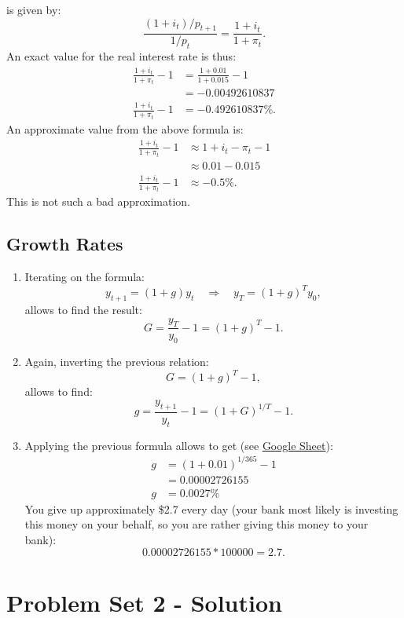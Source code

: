 \documentclass[]{book}
\theoremstyle{definition}
\theoremstyle{definition}
\theoremstyle{definition}
\theoremstyle{remark}
\begin{document}
\begin{enumerate}
  is given by: \[\frac{(1+i_t)/p_{t+1}}{1/p_t}=\frac{1+i_t}{1+\pi_t}.\]
  An exact value for the real interest rate is thus: \[\begin{aligned}
  \frac{1+i_t}{1+\pi_t}-1&=\frac{1+0.01}{1+0.015}-1\\
  &=-0.00492610837\\ 
  \frac{1+i_t}{1+\pi_t}-1&= -0.492610837\%.
  \end{aligned}\] An approximate value from the above formula is:
  \[\begin{aligned}
  \frac{1+i_t}{1+\pi_t}-1&\approx1+i_t-\pi_t-1\\
  &\approx0.01-0.015\\
  \frac{1+i_t}{1+\pi_t}-1&\approx-0.5\%.
  \end{aligned}\] This is not such a bad approximation.
\end{enumerate}

\section{Growth Rates}\label{growth-rates-1}

\begin{enumerate}
\def\labelenumi{\arabic{enumi}.}
\item
  Iterating on the formula:
  \[y_{t+1}=(1+g)y_t \quad \Rightarrow \quad y_T=(1+g)^Ty_0,\] allows to
  find the result: \[G = \frac{y_T}{y_0}-1=(1+g)^T-1.\]
\item
  Again, inverting the previous relation: \[G = (1+g)^T-1,\] allows to
  find: \[g = \frac{y_{t+1}}{y_{t}}-1=(1+G)^{1/T}-1.\]
\item
  Applying the previous formula allows to get (see
  \href{https://docs.google.com/spreadsheets/d/108I8xuosIQvgU6wOGrfwzHhE4p1OStgv8iIpzZ-4vME/edit?usp=sharing}{Google
  Sheet}): \[\begin{aligned}
  g &=(1+0.01)^{1/365}-1\\
   &= 0.00002726155\\
  g &=0.0027\%
  \end{aligned}\] You give up approximately \$2.7 every day (your bank
  most likely is investing this money on your behalf, so you are rather
  giving this money to your bank): \[0.00002726155*100000=2.7.\]
\end{enumerate}

\hypertarget{pset2-sol}{\chapter{Problem Set 2 -
Solution}\label{pset2-sol}}
\end{document}
